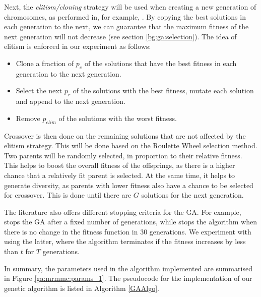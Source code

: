 \documentclass[12pt, twoside, a4paper]{report}
\begin{document}
Next, the \textit{elitism/cloning} strategy will be used when creating a new generation of chromosomes, as performed in, for example, \cite{RefWorks:212}. By copying the best solutions in each generation to the next, we can guarantee that the maximum fitness of the next generation will not decrease (see section \ref{bg:ga:selection}). The idea of elitism is enforced in our experiment as follows:
\begin{itemize}
  \item Clone a fraction of $p_e$ of the solutions that have the best fitness in each generation to the next generation.
  \item Select the next $p_r$ of the solutions with the best fitness, mutate each solution and append to the next generation.
  \item Remove $p_{elim}$ of the solutions with the worst fitness.
\end{itemize}

Crossover is then done on the remaining solutions that are not affected by the elitism strategy. This will be done based on the Roulette Wheel selection method. Two parents will be randomly selected, in proportion to their relative fitness. This helps to boost the overall fitness of the offsprings, as there is a higher chance that a relatively fit parent is selected. At the same time, it helps to generate diversity, as parents with lower fitness also have a chance to be selected for crossover. This is done until there are $G$ solutions for the next generation.

The literature also offers different stopping criteria for the GA. For example, \cite{RefWorks:202} stops the GA after a fixed number of generations, while \cite{RefWorks:212} stops the algorithm when there is no change in the fitness function in 30 generations. We experiment with using the latter, where the algorithm terminates if the fitness increases by less than $t$ for $T$ generations.

In summary, the parameters used in the algorithm implemented are summarised in Figure \ref{ga:mrmmc:params_1}. The pseudocode for the implementation of our genetic algorithm is listed in Algorithm \ref{GAAlgo}.
\end{document}
